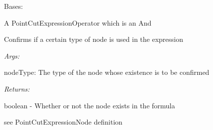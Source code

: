 \documentclass[letterpaper,10pt,english]{sphinxmanual}
\begin{document}
\begin{fulllineitems}
\label{modules/index:aosb.core.PointCutExpressionAnd}
Bases: {\hyperref[modules/index:aosb.core.PointCutExpressionOperator]{}}

A PointCutExpressionOperator which is an And

\begin{fulllineitems}
\label{modules/index:aosb.core.PointCutExpressionAnd.expressionUses}
Confirms if a certain type of node is used in the expression

\begin{DUlineblock}{0em}
\item[] \emph{Args:}
\item[]
\begin{DUlineblock}{\DUlineblockindent}
\item[] nodeType: The type of the node whose existence is to be confirmed
\end{DUlineblock}
\end{DUlineblock}

\begin{DUlineblock}{0em}
\item[] \emph{Returns:}
\item[]
\begin{DUlineblock}{\DUlineblockindent}
\item[] boolean - Whether or not the node exists in the formula
\end{DUlineblock}
\end{DUlineblock}

\end{fulllineitems}


\begin{fulllineitems}
\label{modules/index:aosb.core.PointCutExpressionAnd.match}
see PointCutExpressionNode definition

\end{fulllineitems}


\begin{fulllineitems}
\label{modules/index:aosb.core.PointCutExpressionAnd.numberOfMatchingParts}
\end{fulllineitems}


\end{fulllineitems}
\end{document}
